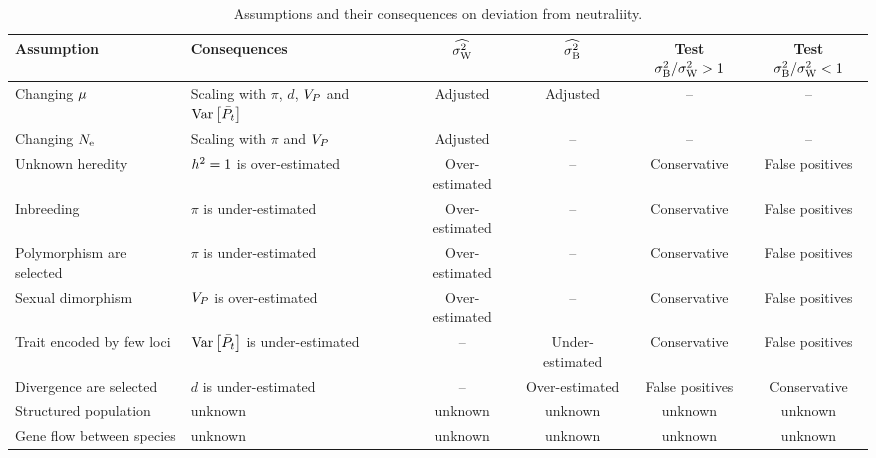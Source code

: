 \documentclass{article}
\begin{document}
\begin{table*}[t!]
    \centering
    \begin{adjustbox}{width = 1.0\textwidth}
    \begin{tabular}{||l|l||c|c||c|c||}
            \hline
            Assumption & Consequences & $\widehat{\sigma^2_{\mathrm{W}}}$ & $\widehat{\sigma^2_{\mathrm{B}}}$ & Test $\sigma^2_{\mathrm{B}} / \sigma^2_{\mathrm{W}} > 1$  & Test $\sigma^2_{\mathrm{B}} / \sigma^2_{\mathrm{W}} < 1$ \\ \hline \hline
            Changing $\mu$ & Scaling with $\pi$, $d$, $V_{P}$ and $\operatorname{\text{Var}} \left[\bar{P_{t}}\right]$ & Adjusted & Adjusted & -- & --  \\ \hline
            Changing $N_{\text{e}}$ & Scaling with $\pi$ and $V_{P}$ & Adjusted & -- & -- & --  \\ \hline
            Unknown heredity & $h^2 = 1$ is over-estimated  & Over-estimated & -- & Conservative & False positives  \\ \hline
            Inbreeding & $\pi$ is under-estimated  & Over-estimated & -- & Conservative & False positives  \\ \hline
            Polymorphism are selected & $\pi$ is under-estimated  & Over-estimated & -- & Conservative & False positives  \\ \hline
            Sexual dimorphism & $V_{P}$ is over-estimated  & Over-estimated & -- & Conservative & False positives  \\ \hline
            Trait encoded by few loci & $\operatorname{\text{Var}} \left[\bar{P_{t}}\right]$ is under-estimated  & -- & Under-estimated & Conservative & False positives  \\ \hline
            Divergence are selected & $d$ is under-estimated & -- & Over-estimated & False positives & Conservative  \\ \hline
            Structured population & unknown & unknown & unknown & unknown & unknown \\ \hline
            Gene flow between species & unknown & unknown & unknown & unknown & unknown \\ \hline
    \end{tabular}
    \end{adjustbox}
    \caption{Assumptions and their consequences on deviation from neutraliity.}
    \label{table:assumptions}
\end{table*}
\end{document}
